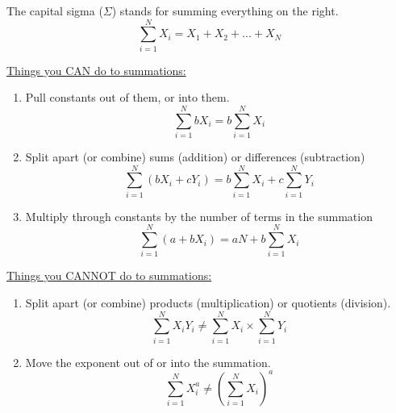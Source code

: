 \documentclass{./../../Latex/handout}
\begin{document}
\thispagestyle{plain}
\begin{center}
\end{center}	

The capital sigma ($\Sigma$) stands for summing everything on the right. 
$$ \sum_{i=1}^N X_i = X_1 + X_2 + ... + X_N $$

\underline{Things you CAN do to summations:}
\begin{enumerate}
\item Pull constants out of them, or into them.
$$ \sum_{i=1}^N b X_i = b \sum_{i=1}^N X_i  $$
\item Split apart (or combine) sums (addition) or differences (subtraction)
$$ \sum_{i=1}^N (b X_i + c Y_i) = b \sum_{i=1}^N X_i  + c \sum_{i=1}^N Y_i $$
\item Multiply through constants by the number of terms in the summation
$$ \sum_{i=1}^N (a+b X_i)= aN + b \sum_{i=1}^N X_i  $$
\end{enumerate}

\underline{Things you CANNOT do to summations:}
\begin{enumerate}
\item Split apart (or combine) products (multiplication) or quotients (division).
$$ \sum_{i=1}^N X_i Y_i \neq  \sum_{i=1}^N X_i \times \sum_{i=1}^N Y_i   $$
\item Move the exponent out of or into the summation.
$$ \sum_{i=1}^N X_i^a \neq  \left(\sum_{i=1}^N X_i\right)^a $$
\end{enumerate}
\end{document}
